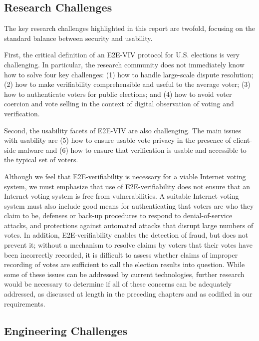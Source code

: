 \subsection{Research Challenges}

The key research challenges highlighted in this report are twofold,
focusing on the standard balance between security and usability.

First, the critical definition of an E2E-VIV protocol for
U.S. elections is very challenging. In particular, the research
community does not immediately know how to solve four key challenges:
(1) how to handle large-scale dispute resolution; (2) how to make
verifiability comprehensible and useful to the average voter; (3) how
to authenticate voters for public elections; and (4) how to avoid
voter coercion and vote selling in the context of digital observation
of voting and verification.

Second, the usability facets of E2E-VIV are also challenging. The main
issues with usability are (5) how to ensure usable vote privacy in the
presence of client-side malware and (6) how to ensure that
verification is usable and accessible to the typical set of voters.

Although we feel that E2E-verifiability is necessary for a viable
Internet voting system, we must emphasize that use of
E2E-verifiability does not ensure that an Internet voting system is
free from vulnerabilities.  A suitable Internet voting system must
also include good means for authenticating that voters are who they
claim to be, defenses or back-up procedures to respond to
denial-of-service attacks, and protections against automated attacks
that disrupt large numbers of votes.  In addition, E2E-verifiability
enables the detection of fraud, but does not prevent it; without a
mechanism to resolve claims by voters that their votes have been
incorrectly recorded, it is difficult to assess whether claims of
improper recording of votes are sufficient to call the election
results into question.  While some of these issues can be addressed by
current technologies, further research would be necessary to determine
if all of these concerns can be adequately addressed, as discussed at
length in the preceding chapters and as codified in our requirements.

\subsection{Engineering Challenges}

